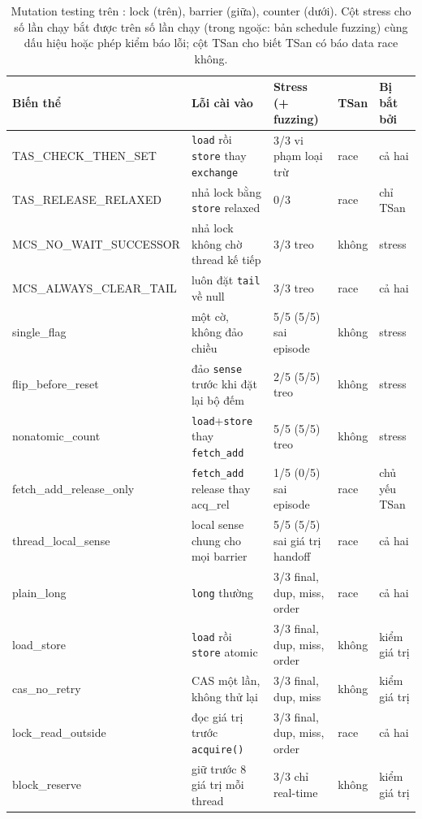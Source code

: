 \begin{table}[tbp]\centering\scriptsize\setlength{\tabcolsep}{3pt}
\begin{tabularx}{\linewidth}{@{}>{\ttfamily}l>{\raggedright\arraybackslash}Xlll@{}}
\toprule
\normalfont\textbf{Biến thể} & \textbf{Lỗi cài vào} & \textbf{Stress (+ fuzzing)} & \textbf{TSan} & \textbf{Bị bắt bởi} \\
\midrule
TAS\_CHECK\_THEN\_SET & \texttt{load} rồi \texttt{store} thay \texttt{exchange} & 3/3 vi phạm loại trừ & race & cả hai \\
TAS\_RELEASE\_RELAXED & nhả lock bằng \texttt{store} relaxed & 0/3 & race & chỉ TSan \\
MCS\_NO\_WAIT\_SUCCESSOR & nhả lock không chờ thread kế tiếp & 3/3 treo & không & stress \\
MCS\_ALWAYS\_CLEAR\_TAIL & luôn đặt \texttt{tail} về null & 3/3 treo & race & cả hai \\
\midrule
single\_flag & một cờ, không đảo chiều & 5/5 (5/5) sai episode & không & stress \\
flip\_before\_reset & đảo \texttt{sense} trước khi đặt lại bộ đếm & 2/5 (5/5) treo & không & stress \\
nonatomic\_count & \texttt{load}+\texttt{store} thay \texttt{fetch\_add} & 5/5 (5/5) treo & không & stress \\
fetch\_add\_release\_only & \texttt{fetch\_add} release thay acq\_rel & 1/5 (0/5) sai episode & race & chủ yếu TSan \\
thread\_local\_sense & local sense chung cho mọi barrier & 5/5 (5/5) sai giá trị handoff & race & cả hai \\
\midrule
plain\_long & \texttt{long} thường & 3/3 final, dup, miss, order & race & cả hai \\
load\_store & \texttt{load} rồi \texttt{store} atomic & 3/3 final, dup, miss, order & không & kiểm giá trị \\
cas\_no\_retry & CAS một lần, không thử lại & 3/3 final, dup, miss & không & kiểm giá trị \\
lock\_read\_outside & đọc giá trị trước \texttt{acquire()} & 3/3 final, dup, miss, order & race & cả hai \\
block\_reserve & giữ trước 8 giá trị mỗi thread & 3/3 chỉ real-time & không & kiểm giá trị \\
\bottomrule
\end{tabularx}
\caption{Mutation testing trên : lock (trên), barrier (giữa), counter (dưới). Cột stress
cho số lần chạy bắt được trên số lần chạy (trong ngoặc: bản schedule fuzzing) cùng dấu hiệu hoặc phép kiểm
báo lỗi; cột TSan cho biết TSan có báo data race không.}
\label{tab:corr:mutation}
\end{table}

